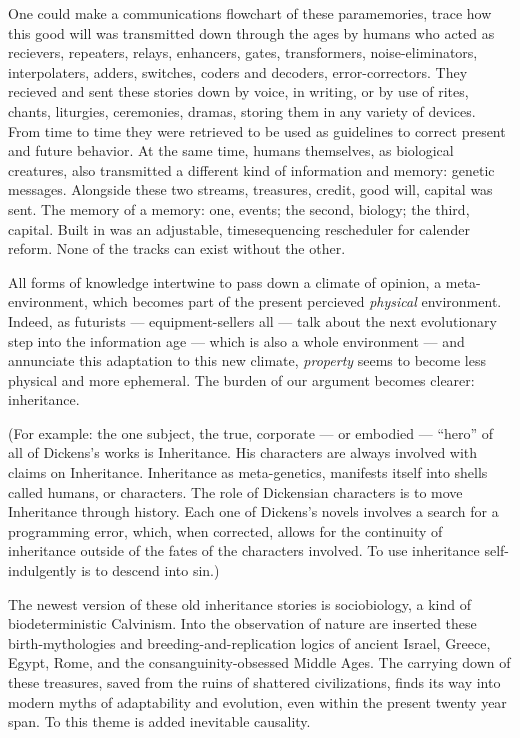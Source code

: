 \documentclass[11pt,twoside,draft]{memoir}
\begin{document}
One could make a communications flowchart of these paramemories, trace how this
good will was transmitted down through the
ages by humans who acted as recievers, repeaters, relays, enhancers, gates, transformers, noise-eliminators, interpolaters, adders,
switches, coders and decoders, error-correctors. They recieved
and sent these stories
down by voice, in writing, or by use of rites,
chants, liturgies, ceremonies, dramas, storing them in any variety of devices. From
time to time they were retrieved to be used as
guidelines to correct present and future behavior.
At the same time, humans themselves, as biological creatures, also transmitted a different kind of information and
memory: genetic messages. Alongside these two
streams, treasures, credit, good will, capital was sent. The memory of a memory:
one, events; the second, biology; the third,
capital. Built in was an adjustable, timesequencing rescheduler for calender reform.
None of the tracks can exist without the
other.

All forms of knowledge intertwine to pass
down a climate of opinion, a meta-environment, which becomes part of the present
percieved \emph{physical} environment. Indeed, as
futurists --- equipment-sellers all --- talk about
the next evolutionary step into the information age --- which is also a whole environment --- and annunciate this adaptation to this new climate, \emph{property} seems to become
less physical and more ephemeral. The
burden of our argument becomes clearer:
inheritance.

(For example: the one subject, the true,
corporate --- or embodied --- \enquote{hero} of all of
Dickens's works is Inheritance. His characters are always involved with claims on
Inheritance. Inheritance as meta-genetics,
manifests itself into shells called humans, or
characters. The role of Dickensian characters
is to move Inheritance through history. Each
one of Dickens's novels involves a search for
a programming error, which, when corrected,
allows for the continuity of inheritance outside of the fates of the characters involved.
To use inheritance self-indulgently is to
descend into sin.)

The newest version of these old inheritance stories is sociobiology, a kind of biodeterministic Calvinism. Into the observation of nature are inserted these birth-mythologies and breeding-and-replication logics
of ancient Israel, Greece, Egypt, Rome, and
the consanguinity-obsessed Middle Ages.
The carrying down of these treasures, saved
from the ruins of shattered civilizations,
finds its way into modern myths of adaptability and evolution, even within the present
twenty year span. To this theme is added
inevitable causality.
\end{document}
